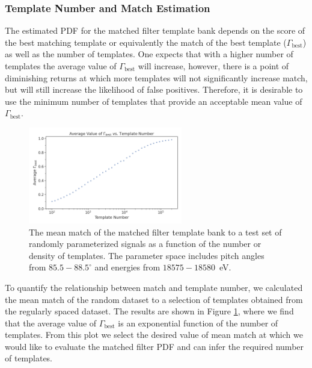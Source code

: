 \subsubsection{Template Number and Match Estimation}
The estimated PDF for the matched filter template bank depends on the score of the best matching template or equivalently the match of the best template ($\Gamma_\mathrm{best}$) as well as the number of templates. One expects that with a higher number of templates the average value of $\Gamma_\mathrm{best}$ will increase, however, there is a point of diminishing returns at which more templates will not significantly increase match, but will still increase the likelihood of false positives. Therefore, it is desirable to use the minimum number of templates that provide an acceptable mean value of $\Gamma_\mathrm{best}$.
\begin{figure}[htbp]
    \centering
    \includegraphics[width=0.6\textwidth]{figs/Chapter-4/230426_mean_match_vs_templates.png}
    \caption{The mean match of the matched filter template bank to a test set of randomly parameterized signals as a function of the number or density of templates. The parameter space includes pitch angles from $85.5-88.5^\circ$ and energies from $18575-18580$~eV.}
    \label{fig:match_vs_template_number}
\end{figure}

To quantify the relationship between match and template number, we calculated the mean match of the random dataset to a selection of templates obtained from the regularly spaced dataset. The results are shown in Figure \ref{fig:match_vs_template_number}, where we find that the average value of $\Gamma_\mathrm{best}$ is an exponential function of the number of templates. From this plot we select the desired value of mean match at which we would like to evaluate the matched filter PDF and can infer the required number of templates. 

